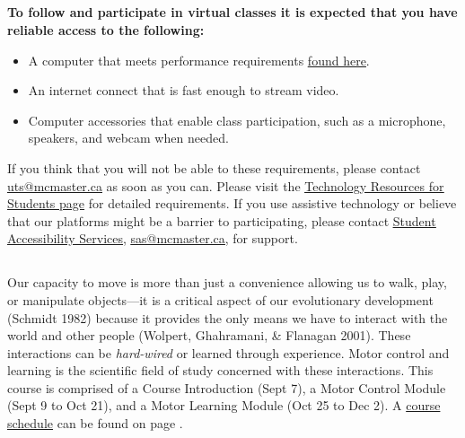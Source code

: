 \documentclass[hidelinks,11pt]{article}
\begin{document}
\subsection*{{}}
\vspace{-0.75em}\textbf{To follow and participate in virtual classes it is expected that you have reliable access to the following:}
\vspace{-2.5em}\begin{itemize}\itemsep0em
  \item A computer that meets performance requirements \href{https://cto.mcmaster.ca/technology-resources-for-mcmaster-students/}{\underline{found here}}.
  \item An internet connect that is fast enough to stream video.
  \item Computer accessories that enable class participation, such as a microphone, speakers, and webcam when needed.
\end{itemize}
If you think that you will not be able to these requirements, please contact \href{mailto:uts@mcmaster.ca}{\underline{uts@mcmaster.ca}} as soon as you can. Please visit the \href{https://cto.mcmaster.ca/technology-resources-for-mcmaster-students/#tab-content-device-recommendations}{\underline{Technology Resources for Students page}} for detailed requirements. If you use assistive technology or believe that our platforms might be a barrier to participating, please contact \newline \href{https://sas.mcmaster.ca/}{\underline{Student Accessibility Services}}, \href{mailto:sas@mcmaster.ca}{\underline{sas@mcmaster.ca}}, for support.

\subsection*{{}}
\vspace{-0.75em}\subsubsection*{{}}
Our capacity to move is more than just a convenience allowing us to walk, play, or manipulate objects---it is a critical aspect of our evolutionary development (Schmidt 1982) because it provides the only means we have to interact with the world and other people (Wolpert, Ghahramani, \& Flanagan 2001). These interactions can be \emph{hard-wired} or learned through experience. Motor control and learning is the scientific field of study concerned with these interactions. This course is comprised of a Course Introduction (Sept 7), a Motor Control Module (Sept 9 to Oct 21), and a Motor Learning Module (Oct 25 to Dec 2). A \hyperref[tab:schedule]{course schedule} can be found on page \pageref{tab:schedule}.
\end{document}
